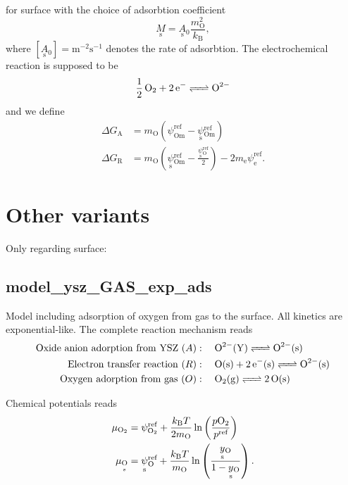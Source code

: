 \documentclass{article}
\numberwithin{equation}{section}
\newcommand{\us}[1]{\underset{\textrm{s}}{#1}{}}
\def\kB{k_\mathrm{B}}
\def\Ox{\mathrm{O}}
\newcommand{\OO}{{\ce{O2}}}
\def\yOs{\us y_\textrm{O}}
\def\pO2{p\OO}
\def\DGA{\Delta G_\textrm{A}  }
\def\DGR{\Delta G_\textrm{R}  }
\def\REF{\textrm{ref}}
\begin{document}
for surface with the choice of adsorbtion coefficient
$$
\us M = \us A_0  \frac{m_\Ox^2}{\kB},
$$
where $[\us A_0] = \textrm{m}^{-2} \textrm{s}^{-1}$ denotes the rate of adsorbtion. The electrochemical reaction is supposed to be
\begin{align}
\ce{\frac{1}{2} \Ox_2 + 2\textrm{e}^- <=> \Ox^{2-}}
\end{align}
and we define
\begin{subequations}
\begin{align}
\DGA
&=
m_\Ox
\left(
	\psi_{\textrm{Om}}^\REF
	-
	\us \psi_{\textrm{Om}}^\REF
\right)
\\
\DGR
&= 
m_\Ox
\left(
	\us \psi_{\textrm{Om}}^\REF
	-
	\frac{\us \psi_{\Ox}^\REF}{2}
\right)
-
2 m_\textrm{e} \psi_{\textrm{e}}^\REF.
\end{align}
\end{subequations}




\section{Other variants}
Only regarding surface:

\newcommand{\surf}{\mathrm{s}}
\newcommand{\Y}{\mathrm{Y}}
\newcommand{\gas}{\mathrm{g}}
\subsection{model\_ysz\_GAS\_exp\_ads}
Model including adsorption of oxygen  from gas to the surface. All kinetics are exponential-like. The complete reaction mechanism reads
\begin{subequations}
\begin{align}
\mathrm{Oxide \ anion \ adorption \ from \ YSZ} \ (A) &: \quad 
\ce{\Ox^{2-}(\Y) <=> \Ox^{2-}(\surf)}
\\
\mathrm{Electron \ transfer \ reaction}\ (R) &: \quad 
\ce{\textrm{O}(\surf) +  2\textrm{e}^-(\surf) <=> \Ox^{2-}(\surf)}
\\
\mathrm{Oxygen \ adorption \ from \ gas}\  (O) &: \quad 
\ce{\Ox_2({\gas}) <=> 2 \Ox(\surf)}
\\
\end{align}
\end{subequations}

Chemical potentials reads
\begin{subequations}
\begin{align}
\mu_{\OO} &= \psi_{\OO}^\REF + \frac{\kB T}{2 m_\Ox}\ln 
\left( 
    \frac{\pO2}{p^\REF} 
\right)
\\
\mu_{\us \Ox} 
&= 
\us \psi_{\Ox}^\REF 
+ 
\frac{\kB T}{m_\Ox} \ln 
\left(  
	\frac{\yOs}{1-\yOs}
\right).
\end{align}
\end{subequations}
\end{document}
